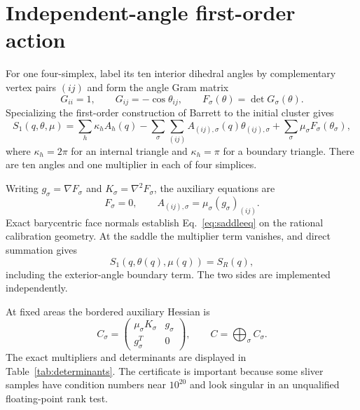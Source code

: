 \documentclass[11pt]{article}
\theoremstyle{definition}
\theoremstyle{remark}
\begin{document}
\section{Independent-angle first-order action}

For one four-simplex, label its ten interior dihedral angles by complementary vertex pairs $(ij)$ and form the angle Gram matrix
\begin{equation}
 G_{ii}=1,\qquad G_{ij}=-\cos\theta_{ij},\qquad
 F_\sigma(\theta)=\det G_\sigma(\theta).
 \label{eq:anglegram}
\end{equation}
Specializing the first-order construction of Barrett \cite{Barrett1994} to the initial cluster gives
\begin{equation}
 S_1(q,\theta,\mu)=
 \sum_h\kappa_h A_h(q)
 -\sum_\sigma\sum_{(ij)} A_{(ij),\sigma}(q)\theta_{(ij),\sigma}
 +\sum_\sigma\mu_\sigma F_\sigma(\theta_\sigma),
 \label{eq:firstorder}
\end{equation}
where $\kappa_h=2\pi$ for an internal triangle and $\kappa_h=\pi$ for a boundary triangle.  There are ten angles and one multiplier in each of four simplices.

Writing $g_\sigma=\nabla F_\sigma$ and $K_\sigma=\nabla^2F_\sigma$, the auxiliary equations are
\begin{equation}
 F_\sigma=0,
 \qquad
 A_{(ij),\sigma}=\mu_\sigma(g_\sigma)_{(ij)}.
 \label{eq:saddleeq}
\end{equation}
Exact barycentric face normals establish Eq.~\eqref{eq:saddleeq} on the rational calibration geometry.  At the saddle the multiplier term vanishes, and direct summation gives
\begin{equation}
 S_1(q,\theta(q),\mu(q))=S_R(q),
 \label{eq:actionequivalence}
\end{equation}
including the exterior-angle boundary term.  The two sides are implemented independently.

At fixed areas the bordered auxiliary Hessian is
\begin{equation}
 C_\sigma=
 \begin{pmatrix}
   \mu_\sigma K_\sigma & g_\sigma\\
   g_\sigma^{T}&0
 \end{pmatrix},
 \qquad C=\bigoplus_\sigma C_\sigma.
 \label{eq:Cblock}
\end{equation}
The exact multipliers and determinants are displayed in Table~\ref{tab:determinants}.  The certificate is important because some sliver samples have condition numbers near $10^{20}$ and look singular in an unqualified floating-point rank test.
\end{document}
